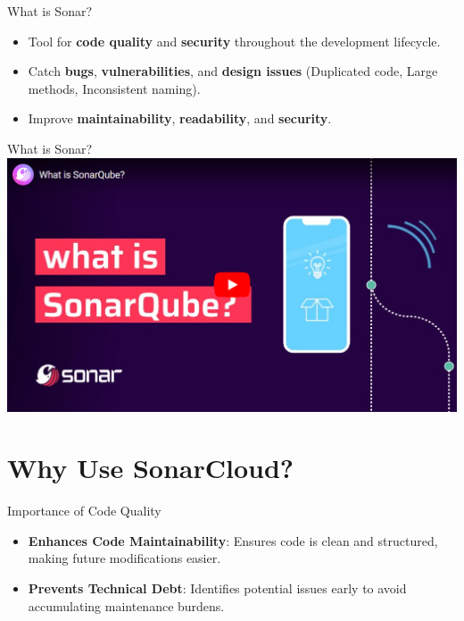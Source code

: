 \documentclass{beamer}
\begin{document}
\begin{frame}{What is Sonar?}
  \begin{itemize}
    \item Tool for \textbf{code quality} and \textbf{security} throughout the development lifecycle.
    \item Catch \textbf{bugs}, \textbf{vulnerabilities}, and \textbf{design issues} 
    (Duplicated code, Large methods, Inconsistent naming).
    \item Improve \textbf{maintainability}, \textbf{readability}, and \textbf{security}.
  \end{itemize}
\end{frame}

\begin{frame}{What is Sonar?}
  \href{https://youtu.be/xeTwG9XFFTE}{\includegraphics[scale=0.45]{fig/what_is_sonar_video.png}}
\end{frame}


\section[Why Use SonarCloud?]{Why Use SonarCloud?}

\begin{frame}{Importance of Code Quality}
  \begin{itemize}
    \item \textbf{Enhances Code Maintainability}: Ensures code is clean and structured, making future modifications easier.
    \item \textbf{Prevents Technical Debt}: Identifies potential issues early to avoid accumulating maintenance burdens.
  \end{itemize}
\end{frame}
\end{document}
